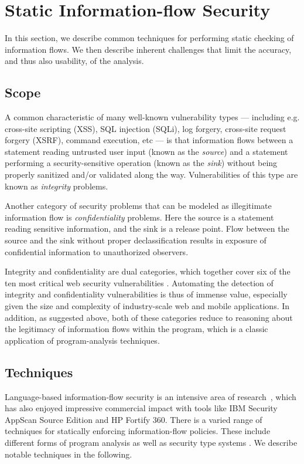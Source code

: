 \section{Static Information-flow Security}\label{Se:analysis}

In this section, we describe common techniques for performing static checking of information flows. We then describe inherent challenges that limit the accuracy, and thus also usability, of the analysis.

\subsection{Scope}

A common characteristic of many well-known vulnerability types --- including e.g. cross-site scripting (XSS), SQL injection (SQLi), log forgery, cross-site request forgery (XSRF), command execution, etc --- is that information flows between a statement reading untrusted user input (known as the \emph{source}) and a statement performing a security-sensitive operation (known as the \emph{sink}) without being properly sanitized and/or validated along the way. Vulnerabilities of this type are known as \emph{integrity} problems. 

Another category of security problems that can be modeled as illegitimate information flow is \emph{confidentiality} problems. Here the source is a statement reading sensitive information, and the sink is a release point. Flow between the source and the sink without proper declassification results in exposure of confidential information to unauthorized observers.

Integrity and confidentiality are dual categories, which together cover six of the ten most critical web security vulnerabilities \cite{OWASP:TOP10}. Automating the detection of integrity and confidentiality vulnerabilities is thus of immense value, especially given the size and complexity of industry-scale web and mobile applications. In addition, as suggested above, both of these categories reduce to reasoning about the legitimacy of information flows within the program, which is a classic application of program-analysis techniques.

\subsection{Techniques}

Language-based information-flow security is an intensive area of research~\cite{Sabelfeld&Myers}, which has also enjoyed impressive commercial impact with tools like IBM Security AppScan Source Edition and HP Fortify 360. There is a varied range of techniques for statically enforcing information-flow policies. These include different forms of program analysis \cite{XXX} as well as security type systems \cite{XXX}. We describe notable techniques in the following.

